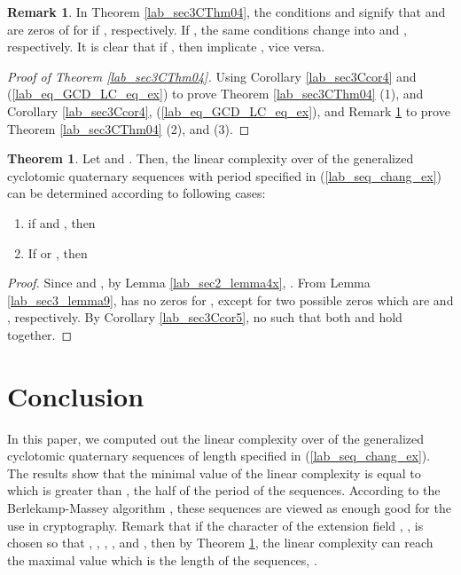 \documentclass{mcom-l}
\theoremstyle{definition}
\newtheorem{sec3Cremark4}[sec3_remark1]{Remark}
\newtheorem{sec3CThm05}[sec3thm1]{Theorem}
\numberwithin{equation}{section}
\begin{document}
    \begin{sec3Cremark4}\label{Lab_sec3Cremark4}
    In Theorem \ref{lab_sec3CThm04}, the conditions  and  signify that   and  are zeros of   for  if , respectively. If , the same conditions change into  and , respectively. It is clear that if , then  implicate , vice versa.
    \end{sec3Cremark4}
    \begin{proof}[Proof of Theorem \ref{lab_sec3CThm04}]
    Using Corollary \ref{lab_sec3Ccor4} and (\ref{lab_eq_GCD_LC_eq_ex}) to prove Theorem \ref{lab_sec3CThm04} (1), and  Corollary \ref{lab_sec3Ccor4}, (\ref{lab_eq_GCD_LC_eq_ex}), and Remark \ref{Lab_sec3Cremark4} to prove Theorem \ref{lab_sec3CThm04} (2), and (3).
    \end{proof}
    
    \begin{sec3CThm05}\label{lab_sec3CThm05}
     Let  and . Then, the linear complexity over  of the generalized cyclotomic quaternary sequences with period  specified in (\ref{lab_seq_chang_ex}) can be determined according to following cases:
     \begin{enumerate}
     \item if  and , then 
      
      \item If  or , then 
          
     \end{enumerate}
        
    \end{sec3CThm05}
   \begin{proof}
   Since  and , by Lemma \ref{lab_sec2_lemma4x}, . From Lemma \ref{lab_sec3_lemma9},  has no zeros for , except for two possible zeros which are  and , respectively. By Corollary \ref{lab_sec3Ccor5}, no  such that both  and  hold together.
   \end{proof}
 
    
 \section{Conclusion}
 In this paper, we computed out the linear complexity over   of the  generalized cyclotomic quaternary sequences of length  specified in (\ref{lab_seq_chang_ex}). The results show that the minimal value of the linear complexity  is equal to  which is greater than , the half of the period of the sequences. According to the Berlekamp-Massey algorithm \cite{B5}, these sequences are viewed as enough good for the use in cryptography. Remark that if the character of the extension field , , is chosen so that , , , , and , then by Theorem \ref{lab_sec3CThm05}, the linear complexity can reach the maximal value which is the length of the sequences, .
\end{document}
